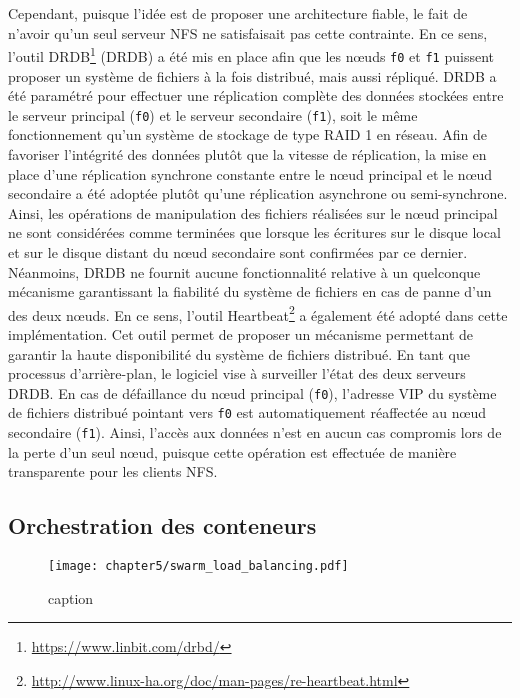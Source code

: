 Cependant, puisque l'idée est de proposer une architecture fiable, le fait de n'avoir qu'un seul serveur \acs{NFS} ne satisfaisait pas cette contrainte. En ce sens, l'outil \acs{DRDB}\footnote{\url{https://www.linbit.com/drbd/}} (\acl{DRDB}) a été mis en place afin que les n\oe{}uds \texttt{f0} et \texttt{f1} puissent proposer un système de fichiers à la fois distribué, mais aussi répliqué. \acs{DRDB} a été paramétré pour effectuer une réplication complète des données stockées entre le serveur principal (\texttt{f0}) et le serveur secondaire (\texttt{f1}), soit le même fonctionnement qu'un système de stockage de type \acs{RAID} 1 en réseau. Afin de favoriser l'intégrité des données plutôt que la vitesse de réplication, la mise en place d'une réplication synchrone constante entre le n\oe{}ud principal et le n\oe{}ud secondaire a été adoptée plutôt qu'une réplication asynchrone ou semi-synchrone. Ainsi, les opérations de manipulation des fichiers réalisées sur le n\oe{}ud principal ne sont considérées comme terminées que lorsque les écritures sur le disque local et sur le disque distant du n\oe{}ud secondaire sont confirmées par ce dernier. Néanmoins, \acs{DRDB} ne fournit aucune fonctionnalité relative à un quelconque mécanisme garantissant la fiabilité du système de fichiers en cas de panne d'un des deux n\oe{}uds. En ce sens, l'outil Heartbeat\footnote{\url{http://www.linux-ha.org/doc/man-pages/re-heartbeat.html}} a également été adopté dans cette implémentation. Cet outil permet de proposer un mécanisme permettant de garantir la haute disponibilité du système de fichiers distribué. En tant que processus d'arrière-plan, le logiciel vise à surveiller l'état des deux serveurs \acs{DRDB}. En cas de défaillance du n\oe{}ud principal (\texttt{f0}), l'adresse \ac{VIP} du système de fichiers distribué pointant vers \texttt{f0} est automatiquement réaffectée au n\oe{}ud secondaire (\texttt{f1}). Ainsi, l'accès aux données n'est en aucun cas compromis lors de la perte d'un seul n\oe{}ud, puisque cette opération est effectuée de manière transparente pour les clients \acs{NFS}.

\subsection{Orchestration des conteneurs}

\begin{figure}[H]
	\centering
	\texttt{[image: chapter5/swarm\_load\_balancing.pdf]}
        \caption{caption}
	\label{fig:swarm_load_balancing}
\end{figure}

